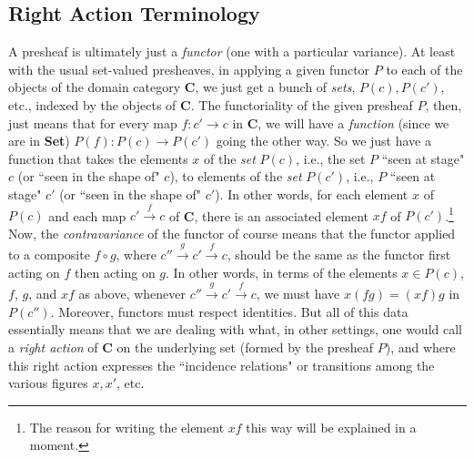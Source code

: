 \documentclass[a4paper]{book}
\theoremstyle{definition}
\theoremstyle{definition}
\theoremstyle{definition}
\theoremstyle{theorem}
\theoremstyle{definition}
\begin{document}
\subsection{Right Action Terminology}
A presheaf is ultimately just a \textit{functor} (one with a particular variance). At least with the usual set-valued presheaves, in applying a given functor $P$ to each of the objects of the domain category \textbf{C}, we just get a bunch of \textit{sets}, $P(c), P(c')$, etc., indexed by the objects of \textbf{C}. The functoriality of the given presheaf $P$, then, just means that for every map $f: c' \rightarrow c$ in \textbf{C}, we will have a \textit{function} (since we are in \textbf{Set}) $P(f): P(c) \rightarrow P(c')$ going the other way. So we just have a function that takes the elements $x$ of the \textit{set} $P(c)$, i.e., the set $P$ ``seen at stage" $c$ (or ``seen in the shape of" $c$), to elements of the \textit{set} $P(c')$, i.e., $P$ ``seen at stage" $c'$ (or ``seen in the shape of" $c'$). In other words, for each element $x$ of $P(c)$ and each map $c' \xrightarrow{f} c$ of \textbf{C}, there is an associated element $xf$ of $P(c')$.\footnote{The reason for writing the element $xf$ this way will be explained in a moment.} Now, the \textit{contravariance} of the functor of course means that the functor applied to a composite $f \circ g$, where $c'' \xrightarrow{g} c' \xrightarrow{f} c$, should be the same as the functor first acting on $f$ then acting on $g$. In other words, in terms of the elements $x \in P(c)$, $f$, $g$, and $xf$ as above, whenever $c'' \xrightarrow{g} c' \xrightarrow{f} c$, we must have $x(fg) = (xf)g$ in $P(c'')$. Moreover, functors must respect identities. But all of this data essentially means that we are dealing with what, in other settings, one would call a \textit{right action} of  \textbf{C} on the underlying set (formed by the presheaf $P$), and where this right action expresses the ``incidence relations" or transitions among the various figures $x, x'$, etc.
\par 
\end{document}
